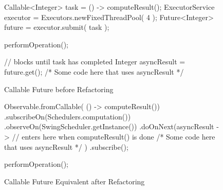 \begin{figure}[H]
\begin{minipage}{0.48\textwidth}
\begin{sourcecode}
\begin{javacode}{}
Callable<Integer> task = () -> computeResult();
ExecutorService executor = 
	Executors.newFixedThreadPool( 4 );
Future<Integer> future = executor.submit( task );

performOperation();

// blocks until task has completed
Integer asyncResult = future.get();
/*
	Some code here that uses asyncResult
 */
\end{javacode}
\caption{Callable Future before Refactoring}
\label{code:callable-before}
\end{sourcecode}
\end{minipage}\hspace{0.7cm}
\begin{minipage}{0.48\textwidth}
\begin{sourcecode}
\begin{javacode}{}
Observable.fromCallable( () -> computeResult())
		.subscribeOn(Schedulers.computation())
		.observeOn(SwingScheduler.getInstance())
		.doOnNext(asyncResult -> {
			// enters here when computeResult() is done
			/*
				Some code here that uses asyncResult
			 */
		})
		.subscribe();

performOperation();
\end{javacode}
\caption{Callable Future Equivalent after Refactoring}
\label{code:callable-after}
\end{sourcecode}
\end{minipage}
\end{figure}